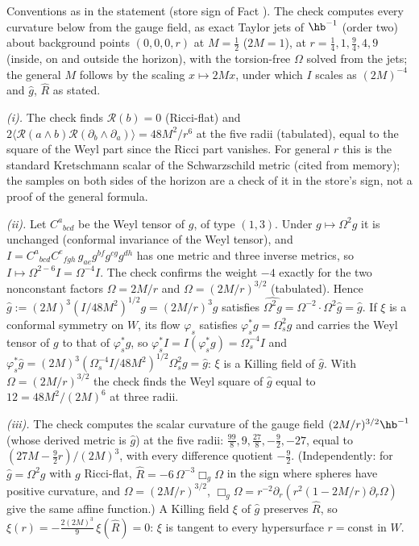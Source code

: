 Conventions as in the statement (store sign of Fact ). The check computes every curvature below from the gauge field, as exact Taylor jets of $\hb^{-1}$ (order two) about background points $(0, 0, 0, r)$ at $M = \tfrac12$ ($2M = 1$), at $r = \tfrac14, 1, \tfrac94, 4, 9$ (inside, on and outside the horizon), with the torsion-free $\Omega$ solved from the jets; the general $M$ follows by the scaling $x \mapsto 2M x$, under which $I$ scales as $(2M)^{-4}$ and $\hat g$, $\hat R$ as stated.

\emph{(i).} The check finds $\mathcal{R}(b) = 0$ (Ricci-flat) and $2\langle\mathcal{R}(a\wedge b)\mathcal{R}(\partial_{b}\wedge\partial_{a})\rangle = 48M^{2}/r^{6}$ at the five radii (tabulated), equal to the square of the Weyl part since the Ricci part vanishes. For general $r$ this is the standard Kretschmann scalar of the Schwarzschild metric (cited from memory); the samples on both sides of the horizon are a check of it in the store's sign, not a proof of the general formula.

\emph{(ii).} Let $C^{a}{}_{bcd}$ be the Weyl tensor of $g$, of type $(1,3)$. Under $g \mapsto \Omega^{2}g$ it is unchanged (conformal invariance of the Weyl tensor), and $I = C^{a}{}_{bcd}C^{e}{}_{fgh}\,g_{ae}g^{bf}g^{cg}g^{dh}$ has one metric and three inverse metrics, so $I \mapsto \Omega^{2 - 6}I = \Omega^{-4}I$. The check confirms the weight $-4$ exactly for the two nonconstant factors $\Omega = 2M/r$ and $\Omega = (2M/r)^{3/2}$ (tabulated). Hence $\hat g := (2M)^{3}(I/48M^{2})^{1/2}g = (2M/r)^{3}g$ satisfies $\widehat{\Omega^{2}g} = \Omega^{-2}\cdot\Omega^{2}\hat g = \hat g$. If $\xi$ is a conformal symmetry on $W$, its flow $\varphi_{s}$ satisfies $\varphi_{s}^{*}g = \Omega_{s}^{2}g$ and carries the Weyl tensor of $g$ to that of $\varphi_{s}^{*}g$, so $\varphi_{s}^{*}I = I(\varphi_{s}^{*}g) = \Omega_{s}^{-4}I$ and $\varphi_{s}^{*}\hat g = (2M)^{3}(\Omega_{s}^{-4}I/48M^{2})^{1/2}\Omega_{s}^{2}g = \hat g$: $\xi$ is a Killing field of $\hat g$. With $\Omega = (2M/r)^{3/2}$ the check finds the Weyl square of $\hat g$ equal to $12 = 48M^{2}/(2M)^{6}$ at three radii.

\emph{(iii).} The check computes the scalar curvature of the gauge field $(2M/r)^{3/2}\hb^{-1}$ (whose derived metric is $\hat g$) at the five radii: $\tfrac{99}{8}, 9, \tfrac{27}{8}, -\tfrac92, -27$, equal to $(27M - \tfrac92 r)/(2M)^{3}$, with every difference quotient $-\tfrac92$. (Independently: for $\hat g = \Omega^{2}g$ with $g$ Ricci-flat, $\hat R = -6\,\Omega^{-3}\Box_{g}\Omega$ in the sign where spheres have positive curvature, and $\Omega = (2M/r)^{3/2}$, $\Box_{g}\Omega = r^{-2}\partial_{r}(r^{2}(1 - 2M/r)\partial_{r}\Omega)$ give the same affine function.) A Killing field $\xi$ of $\hat g$ preserves $\hat R$, so $\xi(r) = -\tfrac{2(2M)^{3}}{9}\,\xi(\hat R) = 0$: $\xi$ is tangent to every hypersurface $r = \mathrm{const}$ in $W$.

